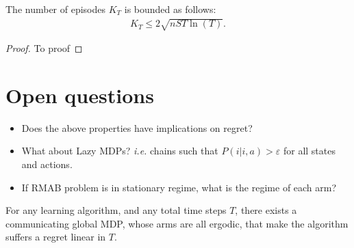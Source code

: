 \begin{lem}
    \label{lem:nb_episodes}
    The number of episodes $K_T$ is bounded as follows:
    \begin{align}
        K_T\le2\sqrt{nST\ln(T)}.
    \end{align}
\end{lem}
\begin{proof}
    To proof
\end{proof}


\section{Open questions}

\begin{itemize}
    \item Does the above properties have implications on regret? 
    \item What about Lazy MDPs? \emph{i.e.} chains such that $P(i | i,a)>\varepsilon$ for all states and actions.
    \item If RMAB problem is in stationary regime, what is the regime of each arm?
\end{itemize}




\begin{thm}
    For any learning algorithm, and any total time steps $T$, there exists a communicating global MDP, whose arms are all ergodic, that make the algorithm suffers a regret linear in $T$.
\end{thm}

